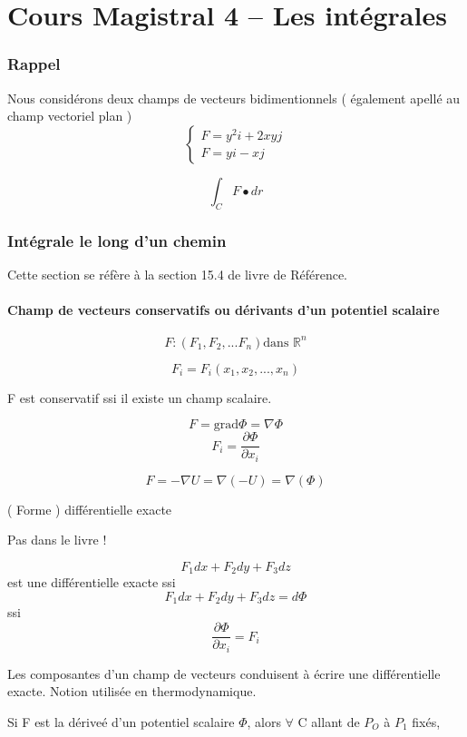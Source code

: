 \part{Cours Magistral 4 -- Les intégrales}
\section{Rappel}

Nous considérons deux champs de vecteurs bidimentionnels ( également apellé au champ vectoriel plan )
$$
\left\{
\begin{array}{c}
F=y^2i+2xyj\\
F = yi-xj
\end{array}
\right.
$$

\[\int_C F\bullet dr \]

\section{Intégrale le long d'un chemin}
Cette section se réfère à la section 15.4 de livre de Référence.

\subsection{Champ de vecteurs conservatifs ou dérivants d'un potentiel scalaire}

\[F:(F_1,F_2,...F_n)\text{dans } \mathbb{R}^n\]

\[F_i=F_i(x_1,x_2,...,x_n)\]

F est conservatif ssi il existe un champ scalaire.

\[F=\text{grad}\Phi = \nabla \Phi\]
\[F_i=\frac{\partial \Phi}{\partial x_i}\]
\begin{myrem}
\[F=-\nabla U = \nabla (- U ) = \nabla ( \Phi ) \]
\end{myrem}

\begin{myrem}({ Forme ) différentielle exacte }

Pas dans le livre !

\[F_1 dx +F_2 dy + F_3 dz \] est une différentielle exacte ssi\[F_1 dx +F_2 dy + F_3 dz  = d \Phi\]
ssi
\[\frac{\partial \Phi}{\partial x_i} = F_i\]
\end{myrem}

Les composantes d'un champ de vecteurs conduisent à écrire une différentielle exacte. Notion utilisée en thermodynamique.

Si F est la dériveé d'un potentiel scalaire $\Phi$, alors $\forall$ C allant de $P_O$ à $P_1$ fixés,

